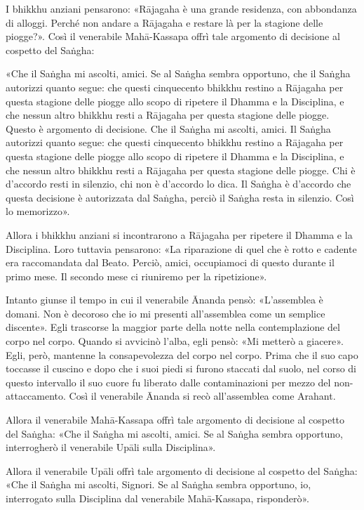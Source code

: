 I bhikkhu anziani pensarono: «Rājagaha è una grande residenza, con
abbondanza di alloggi. Perché non andare a Rājagaha e restare là per la
stagione delle piogge?». Così il venerabile Mahā-Kassapa offrì tale
argomento di decisione al cospetto del Saṅgha:


«Che il Saṅgha mi ascolti, amici. Se al Saṅgha sembra opportuno, che il
Saṅgha autorizzi quanto segue: che questi cinquecento bhikkhu restino a
Rājagaha per questa stagione delle piogge allo scopo di ripetere il
Dhamma e la Disciplina, e che nessun altro bhikkhu resti a Rājagaha per
questa stagione delle piogge. Questo è argomento di decisione. Che il
Saṅgha mi ascolti, amici. Il Saṅgha autorizzi quanto segue: che questi
cinquecento bhikkhu restino a Rājagaha per questa stagione delle piogge
allo scopo di ripetere il Dhamma e la Disciplina, e che nessun altro
bhikkhu resti a Rājagaha per questa stagione delle piogge. Chi è
d’accordo resti in silenzio, chi non è d’accordo lo dica. Il Saṅgha è
d’accordo che questa decisione è autorizzata dal Saṅgha, perciò il
Saṅgha resta in silenzio. Così lo memorizzo».


Allora i bhikkhu anziani si incontrarono a Rājagaha per ripetere il
Dhamma e la Disciplina. Loro tuttavia pensarono: «La riparazione di quel
che è rotto e cadente era raccomandata dal Beato. Perciò, amici,
occupiamoci di questo durante il primo mese. Il secondo mese ci
riuniremo per la ripetizione».


Intanto giunse il tempo in cui il venerabile Ānanda pensò: «L’assemblea
è domani. Non è decoroso che io mi presenti all’assemblea come un
semplice discente». Egli trascorse la maggior parte della notte nella
contemplazione del corpo nel corpo. Quando si avvicinò l’alba, egli
pensò: «Mi metterò a giacere». Egli, però, mantenne la consapevolezza
del corpo nel corpo. Prima che il suo capo toccasse il cuscino e dopo
che i suoi piedi si furono staccati dal suolo, nel corso di questo
intervallo il suo cuore fu liberato dalle contaminazioni per mezzo del
non-attaccamento. Così il venerabile Ānanda si recò all’assemblea come
Arahant.


Allora il venerabile Mahā-Kassapa offrì tale argomento di decisione al
cospetto del Saṅgha: «Che il Saṅgha mi ascolti, amici. Se al Saṅgha
sembra opportuno, interrogherò il venerabile Upāli sulla Disciplina».


Allora il venerabile Upāli offrì tale argomento di decisione al cospetto
del Saṅgha: «Che il Saṅgha mi ascolti, Signori. Se al Saṅgha sembra
opportuno, io, interrogato sulla Disciplina dal venerabile Mahā-Kassapa,
risponderò».



